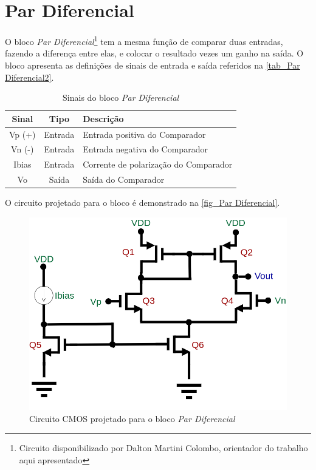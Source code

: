 \renewcommand{\NomeBloco}{\emph{Par Diferencial}}
\renewcommand{\NomeBlocoNoIt}{Par Diferencial}
\renewcommand{\NomePTab}{tab_\NomeBlocoNoIt}
\renewcommand{\NomeSTab}{tab_\NomeBlocoNoIt2}
\renewcommand{\NomePFig}{fig_\NomeBlocoNoIt}
\renewcommand{\NomeSFig}{fig_\NomeBlocoNoIt2}
\renewcommand{\NomeTTab}{tab_\NomeBlocoNoIt3}
\renewcommand{\NomeQTab}{tab_\NomeBlocoNoIt4}

\section{Par Diferencial}

O bloco \NomeBloco{}\footnote{Circuito disponibilizado por Dalton Martini Colombo, orientador do trabalho aqui apresentado} tem a mesma função de comparar duas entradas, fazendo a diferença entre elas, e colocar o resultado vezes um ganho na saída. O bloco apresenta as definições de sinais de entrada e sa\'ida referidos na \autoref{\NomeSTab}.

\begin{table}[htbp]
\caption{Sinais do bloco \NomeBloco}
\label{\NomeSTab}
\centering
\begin{tabular}{ccl}

    \toprule
    Sinal & Tipo    & Descrição        \\
    \midrule \midrule
    Vp (+) & Entrada & Entrada positiva do Comparador\\
    \midrule
    Vn (-) & Entrada & Entrada negativa do Comparador\\
    \midrule
    Ibias & Entrada & Corrente de polarização do Comparador\\
    \midrule
    Vo & Sa\'ida & Sa\'ida do Comparador\\
    \bottomrule
\end{tabular}
\end{table}

O circuito projetado para o bloco \'e demonstrado na \autoref{\NomePFig}.

\begin{figure}[htb]
 \centering
    \centering
    \caption{\label{\NomePFig}Circuito CMOS projetado para o bloco \NomeBloco} 
    \includegraphics[scale=0.4]{Circuitos/diff_pair.png}
\end{figure}

